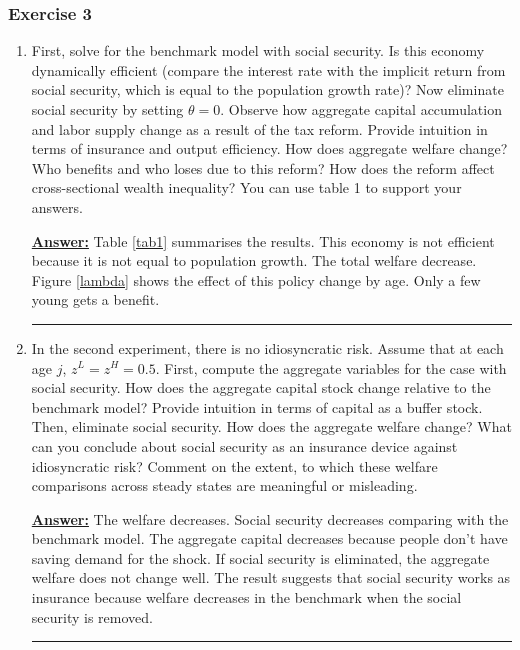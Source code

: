\documentclass{article} %
\theoremstyle{definition}
\newenvironment{solution}[1][Answer]{\begin{singlespace}\underline{\textbf{#1:}}\quad }{\ \rule{0.3em}{0.3em}\end{singlespace}} %
\begin{document}
\subsubsection*{Exercise 3}
\begin{enumerate}
\item First, solve for the benchmark model with social security. Is this economy dynamically efficient (compare the interest rate with the implicit return from social security, which is equal to the population growth rate)? Now eliminate social security by setting $ \theta = 0 $. Observe how aggregate capital accumulation and labor supply change as a result of the tax reform. Provide intuition in terms of insurance and output efficiency. How does aggregate welfare change? Who benefits and who loses due to this reform? How does the reform affect cross-sectional wealth inequality? You can use table 1 to support your answers.
  \begin{solution}
    Table \ref{tab1} summarises the results. This economy is not efficient because it is not equal to population growth. The total welfare decrease. Figure \ref{lambda} shows the effect of this policy change by age. Only a few young gets a benefit. 
  \end{solution}

\item In the second experiment, there is no idiosyncratic risk. Assume that at each age $ j $, $ z^L = z^H = 0.5. $ First, compute the aggregate variables for the case with social security. How does the aggregate capital stock change relative to the benchmark model? Provide intuition in terms of capital as a buffer stock. Then, eliminate social security. How does the aggregate welfare change? What can you conclude about social security as an insurance device against idiosyncratic risk? Comment on the extent, to which these welfare comparisons across steady states are meaningful or misleading.
  \begin{solution}
    The welfare decreases. Social security decreases comparing with the benchmark model. The aggregate capital decreases because people don't have saving demand for the shock. If social security is eliminated, the aggregate welfare does not change well. The result suggests that social security works as insurance because welfare decreases in the benchmark when the social security is removed.     
  \end{solution}
  

\end{enumerate}
\end{document}
